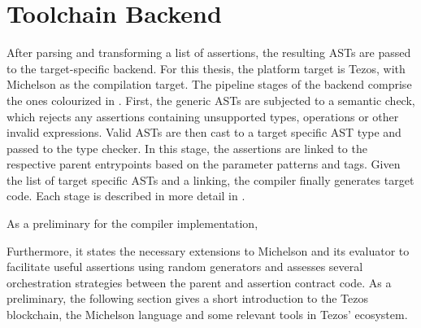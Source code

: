 \chapter{Toolchain Backend}\label{chap:offline_tezos}
After parsing and transforming a list of assertions, the resulting ASTs are passed to the target-specific backend. For this thesis, the platform target is Tezos, with Michelson as the compilation target. The pipeline stages of the backend comprise the ones colourized in . First, the generic ASTs are subjected to a semantic check, which rejects any assertions containing unsupported types, operations or other invalid expressions. Valid ASTs are then cast to a target specific AST type and passed to the type checker. In this stage, the assertions are linked to the respective parent entrypoints based on the parameter patterns and tags. Given the list of target specific ASTs and a linking, the compiler finally generates target code. Each stage is described in more detail in .

As a preliminary for the compiler implementation, 


 Furthermore, it states the necessary extensions to Michelson and its evaluator to facilitate useful assertions using random generators and assesses several orchestration strategies between the parent and assertion contract code. As a preliminary, the following section gives a short introduction to the Tezos blockchain, the Michelson language and some relevant tools in Tezos' ecosystem.

